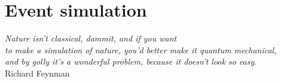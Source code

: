 \chapter{Event simulation}
\label{chp:evtsim}

\begin{flushright}

\begin{small}
\emph{
Nature isn't classical, dammit, and if you want\\ 
to make a simulation of nature, you'd better make it quantum mechanical,\\ 
and by golly it's a wonderful problem, because it doesn't look so easy.\\}
Richard Feynman
\end{small}
\end{flushright}

\minitoc









